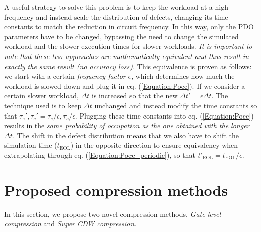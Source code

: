 A useful strategy to solve this problem is to keep the workload at a high frequency and instead scale the distribution of defects, changing its time constants to match the reduction in circuit frequency. In this way, only the PDO parameters have to be changed, bypassing the need to change the simulated workload and the slower execution times for slower workloads. \textit{It is important to note that these two approaches are mathematically equivalent and thus result in exactly the same result (no accuracy loss).} This equivalence is proven as follows: we start with a certain \textit{frequency factor} $\epsilon$, which determines how much the workload is slowed down and plug it in eq. (\ref{Equation:Pocc}). If we consider a certain slower workload, $\Delta t$ is increased so that the new $\Delta t' = \epsilon \Delta t$. The technique used is to keep $\Delta t$ unchanged and instead modify the time constants so that $\tau_e', \tau_c' = \tau_e / \epsilon , \tau_c / \epsilon$. Plugging these time constants into eq. (\ref{Equation:Pocc}) results in the \textit{same probability of occupation as the one obtained with the longer $\Delta t$.} The shift in the defect distribution means that we also have to shift the simulation time ($t_\text{EOL}$) in the opposite direction to ensure equivalency when extrapolating through eq. (\ref{Equation:Pocc_periodic}), so that $t'_\text{EOL} = t_\text{EOL} / \epsilon$. 


\section{Proposed compression methods}
\label{section:new_compression}
In this section, we propose two novel compression methods, \textit{Gate-level compression} and \textit{Super CDW compression}.

